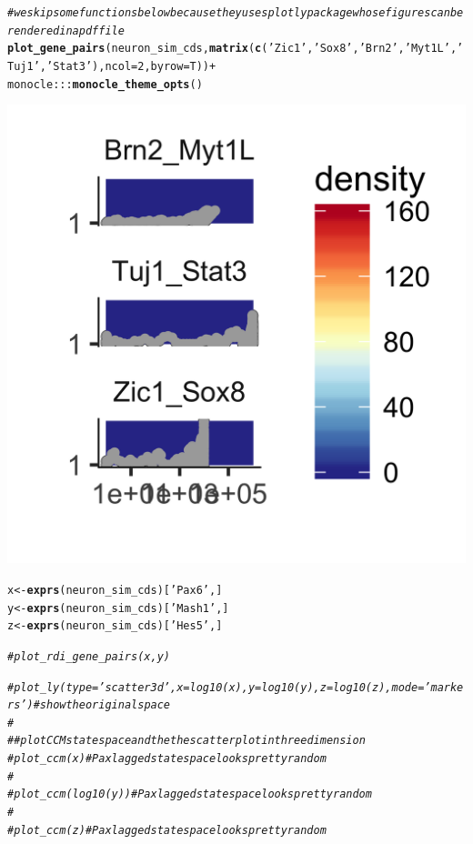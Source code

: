 \documentclass[10pt,oneside]{article}\usepackage[]{graphicx}\usepackage[]{color}
\makeatletter
\def\maxwidth{ %
  \ifdim\Gin@nat@width>\linewidth
    \linewidth
  \else
    \Gin@nat@width
  \fi
}
\newcommand{\hlnum}[1]{\textcolor[rgb]{0.686,0.059,0.569}{#1}}%
\newcommand{\hlstr}[1]{\textcolor[rgb]{0.192,0.494,0.8}{#1}}%
\newcommand{\hlcom}[1]{\textcolor[rgb]{0.678,0.584,0.686}{\textit{#1}}}%
\newcommand{\hlopt}[1]{\textcolor[rgb]{0,0,0}{#1}}%
\newcommand{\hlstd}[1]{\textcolor[rgb]{0.345,0.345,0.345}{#1}}%
\newcommand{\hlkwb}[1]{\textcolor[rgb]{0.69,0.353,0.396}{#1}}%
\newcommand{\hlkwc}[1]{\textcolor[rgb]{0.333,0.667,0.333}{#1}}%
\newcommand{\hlkwd}[1]{\textcolor[rgb]{0.737,0.353,0.396}{\textbf{#1}}}%
\newenvironment{kframe}{%
 \def\at@end@of@kframe{}%
 \ifinner\ifhmode%
  \def\at@end@of@kframe{\end{minipage}}%
  \begin{minipage}{\columnwidth}%
 \fi\fi%
 \def\FrameCommand##1{\hskip\@totalleftmargin \hskip-\fboxsep
 \colorbox{shadecolor}{##1}\hskip-\fboxsep
     \hskip-\linewidth \hskip-\@totalleftmargin \hskip\columnwidth}%
 \MakeFramed {\advance\hsize-\width
   \@totalleftmargin\z@ \linewidth\hsize
   \@setminipage}}%
 {\par\unskip\endMakeFramed%
 \at@end@of@kframe}
\newenvironment{knitrout}{}{} %
\makeatother
\begin{document}
\begin{knitrout}
\color{fgcolor}\begin{kframe}
\begin{alltt}
\hlcom{# we skip some functions below because they uses plotly package whose figures can be rendered in a pdf file }
\hlkwd{plot_gene_pairs}\hlstd{(neuron_sim_cds,} \hlkwd{matrix}\hlstd{(}\hlkwd{c}\hlstd{(}\hlstr{'Zic1'}\hlstd{,} \hlstr{'Sox8'}\hlstd{,} \hlstr{'Brn2'}\hlstd{,} \hlstr{'Myt1L'}\hlstd{,} \hlstr{'Tuj1'}\hlstd{,} \hlstr{'Stat3'}\hlstd{),} \hlkwc{ncol} \hlstd{=} \hlnum{2}\hlstd{,} \hlkwc{byrow} \hlstd{= T))} \hlopt{+}
  \hlstd{monocle}\hlopt{:::}\hlkwd{monocle_theme_opts}\hlstd{()}
\end{alltt}
\end{kframe}

{\centering \includegraphics[width=\maxwidth]{figure/gene_pairwise_plot-1} 

}


\begin{kframe}\begin{alltt}
\hlstd{x} \hlkwb{<-} \hlkwd{exprs}\hlstd{(neuron_sim_cds)[}\hlstr{'Pax6'}\hlstd{, ]}
\hlstd{y} \hlkwb{<-} \hlkwd{exprs}\hlstd{(neuron_sim_cds)[}\hlstr{'Mash1'}\hlstd{, ]}
\hlstd{z} \hlkwb{<-} \hlkwd{exprs}\hlstd{(neuron_sim_cds)[}\hlstr{'Hes5'}\hlstd{, ]}

\hlcom{# plot_rdi_gene_pairs(x, y)}

\hlcom{# plot_ly(type = 'scatter3d', x = log10(x), y = log10(y), z = log10(z), mode = 'markers') # show the original space}
\hlcom{# }
\hlcom{# # plot CCM state space and the the scatter plot in three dimension}
\hlcom{# plot_ccm(x) # Pax lagged state space looks pretty random}
\hlcom{# }
\hlcom{# plot_ccm(log10(y)) #Pax lagged state space looks pretty random}
\hlcom{# }
\hlcom{# plot_ccm(z) #Pax lagged state space looks pretty random}
\end{alltt}
\end{kframe}
\end{knitrout}
\end{document}
